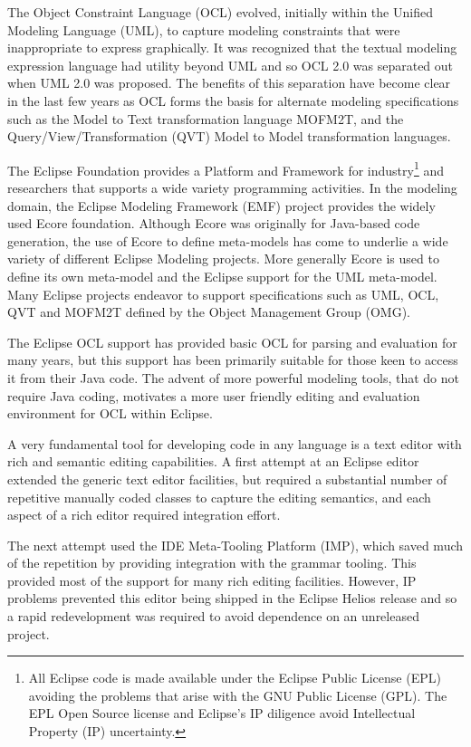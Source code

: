\documentclass[runningheads,a4paper]{llncs}
\begin{document}
The Object Constraint Language (OCL)\cite{OCL} evolved, initially within the Unified Modeling Language (UML)\cite{UML}, to capture modeling constraints that were inappropriate to express graphically. It was recognized that the textual modeling expression language had utility beyond UML and so OCL 2.0 was separated out when UML 2.0 was proposed. The benefits of this separation have become clear in the last few years as OCL forms the basis for alternate modeling specifications such as the Model to Text transformation language MOFM2T\cite{MOFM2T}, and the Query/View/Transformation (QVT)\cite{QVT} Model to Model transformation languages.

The Eclipse Foundation provides a Platform and Framework for industry\footnote{All Eclipse code is made available under the Eclipse Public License (EPL) avoiding the problems that arise with the GNU Public License (GPL). The EPL Open Source license and Eclipse's IP diligence avoid Intellectual Property (IP) uncertainty.} and researchers that supports a wide variety programming activities.  In the modeling domain, the Eclipse Modeling Framework (EMF) project provides the widely used Ecore foundation. Although Ecore was originally for Java-based code generation, the use of Ecore to define meta-models has come to underlie a wide variety of different Eclipse Modeling projects. More generally Ecore is used to define its own meta-model and the Eclipse support for the UML meta-model. Many Eclipse projects endeavor to support specifications such as UML, OCL, QVT and MOFM2T defined by the Object Management Group (OMG).

The Eclipse OCL\cite{MDT/OCL} support has provided basic OCL for parsing and evaluation for many years, but this support has been primarily suitable for those keen to access it from their Java code. The advent of more powerful modeling tools, that do not require Java coding, motivates a more user friendly editing and evaluation environment for OCL within Eclipse.

A very fundamental tool for developing code in any language is a text editor with rich and semantic editing capabilities.
A first attempt at an Eclipse editor extended the generic text editor facilities, but required a substantial number of repetitive manually coded classes to capture the editing semantics, and each aspect of a rich editor required integration effort.

The next attempt used the IDE Meta-Tooling Platform (IMP)\cite{IMP}, which saved much of the repetition by providing integration with the grammar tooling. This provided most of the support for many rich editing facilities. However, IP problems prevented this editor being shipped in the Eclipse Helios\cite{Helios} release and so a rapid redevelopment was required to avoid dependence on an unreleased project.
\end{document}

